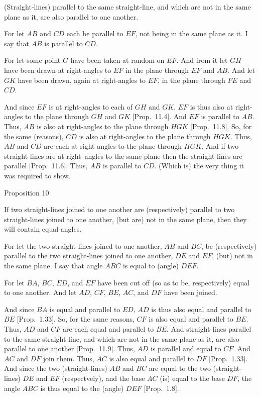 (Straight-lines) parallel to the same straight-line,
and which are not in the same plane as it, are also parallel to one another.

\epsfysize=1.6in
\centerline{}

For let $AB$ and $CD$ each be parallel to $EF$, not being in the
same plane as it. I say that $AB$ is parallel to $CD$.

For let some point $G$ have been taken at random on $EF$. And from it
let $GH$ have been drawn at right-angles to $EF$ in the plane through
$EF$ and $AB$. And let $GK$ have been drawn, again at right-angles
to $EF$, in the plane through  $FE$ and $CD$.

And since $EF$ is at right-angles to each of $GH$ and $GK$, $EF$
is thus also at right-angles to the plane through $GH$ and $GK$ 
[Prop.~11.4]. And $EF$ is parallel to
$AB$. Thus, $AB$ is also at right-angles to the plane through $HGK$
[Prop.~11.8]. So, for the same (reasons), $CD$
is also at right-angles to the plane through $HGK$.  Thus, $AB$ and
$CD$ are each at right-angles to the plane through $HGK$.
And if two straight-lines are at right--angles to the same plane then the 
straight-lines are parallel [Prop.~11.6]. Thus, $AB$ is parallel to
$CD$. (Which is) the very thing it was required to show.


\begin{center}
{\large Proposition 10}
\end{center}

If two straight-lines joined to one another
are (respectively) parallel to two straight-lines joined to one another, (but are) not in the same
plane, then they will contain equal angles.

\centerline{}

For let the two straight-lines joined to one another, $AB$ and $BC$, be (respectively) parallel to the two straight-lines joined to one another, $DE$ and $EF$, (but) not in the same plane. I say that angle $ABC$ is equal to
(angle) $DEF$.

For let $BA$, $BC$, $ED$, and $EF$ have been cut off (so as to be, respectively) equal
to one another. And let $AD$, $CF$, $BE$, $AC$, and $DF$
have been joined.

And since $BA$ is equal and parallel to $ED$, $AD$ is thus also equal
and parallel to $BE$ [Prop.~1.33]. So, for the
same reasons, $CF$ is also equal and parallel to $BE$. Thus, $AD$ and
$CF$ are each equal and parallel to $BE$. And straight-lines parallel to
the same straight-line, and which are not in the same plane as it, are also parallel
to one another [Prop.~11.9]. Thus, $AD$
is parallel and equal to $CF$. And $AC$ and $DF$ join them. Thus, $AC$
is also equal and parallel to $DF$ [Prop.~1.33].
And since the two (straight-lines) $AB$ and $BC$ are equal to the
two (straight-lines) $DE$ and $EF$ (respectvely),  and the base $AC$  (is) equal to the base $DF$, the angle $ABC$ is thus equal to the (angle) $DEF$   
[Prop.~1.8].

